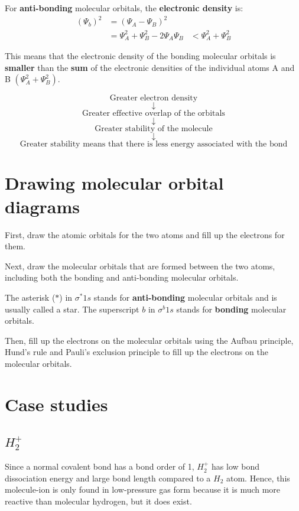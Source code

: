 \documentclass[11pt]{article}
\begin{document}
For \textbf{anti-bonding} molecular orbitals, the \textbf{electronic density} is:
\begin{align*}
(\Psi_b)^2 &= (\Psi_A - \Psi_B)^2 \\
&= \Psi_A^2 + \Psi_B^2 - 2 \Psi_A \Psi_B
&< \Psi_A^2 + \Psi_B^2
\end{align*}

This means that the electronic density of the bonding molecular orbitals is \textbf{smaller} than the \textbf{sum} of the electronic densities of the individual atoms A and B \((\Psi_A^2 + \Psi_B^2)\).


\[\text{Greater electron density}\]
\[\downarrow\]
\[\text{Greater effective overlap of the orbitals}\]
\[\downarrow\]
\[\text{Greater stability of the molecule}\]
\[\downarrow\]
\[\text{Greater stability means that there is less energy associated with the bond}\]
\section{Drawing molecular orbital diagrams}
\label{sec:org0eeea71}
First, draw the atomic orbitals for the two atoms and fill up the electrons for them.


Next, draw the molecular orbitals that are formed between the two atoms, including both the bonding and anti-bonding molecular orbitals.


The asterisk (\(\text{*}\)) in \(\sigma^* 1s\) stands for \textbf{anti-bonding} molecular orbitals and is usually called a star. The superscript \(b\) in \(\sigma^{b} 1s\) stands for \textbf{bonding} molecular orbitals.


Then, fill up the electrons on the molecular orbitals using the Aufbau principle, Hund's rule and Pauli's exclusion principle to fill up the electrons on the molecular orbitals.

\newpage
\section{Case studies}
\label{sec:org74c8d91}

\subsection{\(H_2^+\)}
\label{sec:orgf9ca57e}
Since a normal covalent bond has a bond order of 1, \(H_2^+\) has low bond dissociation energy and large bond length compared to a \(H_2\) atom. Hence, this molecule-ion is only found in low-pressure gas form because it is much more reactive than molecular hydrogen, but it does exist.
\end{document}
